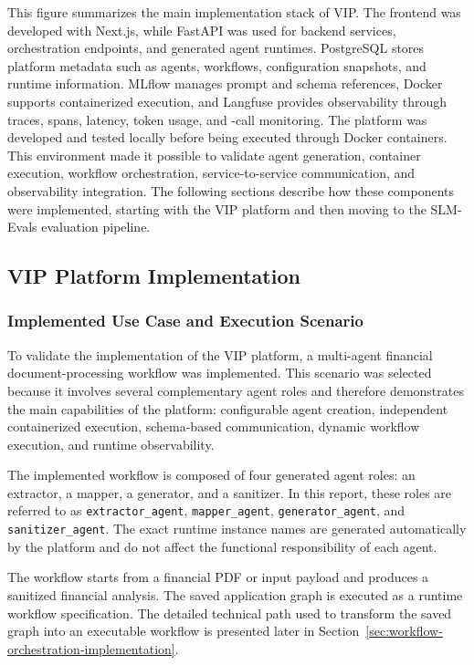 This figure summarizes the main implementation stack of VIP. The frontend was developed with Next.js, while FastAPI was used for backend services, orchestration endpoints, and generated agent runtimes. PostgreSQL stores platform metadata such as agents, workflows, configuration snapshots, and runtime information. MLflow manages prompt and schema references, Docker supports containerized execution, and Langfuse provides observability through traces, spans, latency, token usage, and 
-call monitoring.
\vspace{0.4cm}
The platform was developed and tested locally before being executed through Docker containers. This environment made it possible to validate agent generation, container execution, workflow orchestration, service-to-service communication, and observability integration. The following sections describe how these components were implemented, starting with the VIP platform and then moving to the SLM-Evals evaluation pipeline.



\subsection{VIP Platform Implementation}
    \subsubsection{Implemented Use Case and Execution Scenario}
 \label{sec:implemented-use-case}

To validate the implementation of the VIP platform, a multi-agent financial document-processing workflow was implemented. This scenario was selected because it involves several complementary agent roles and therefore demonstrates the main capabilities of the platform: configurable agent creation, independent containerized execution, schema-based communication, dynamic workflow execution, and runtime observability.

The implemented workflow is composed of four generated agent roles: an extractor, a mapper, a generator, and a sanitizer. In this report, these roles are referred to as \texttt{extractor\_agent}, \texttt{mapper\_agent}, \texttt{generator\_agent}, and \texttt{sanitizer\_agent}. The exact runtime instance names are generated automatically by the platform and do not affect the functional responsibility of each agent.

The workflow starts from a financial PDF or input payload and produces a sanitized financial analysis. The saved application graph is executed as a runtime workflow specification. The detailed technical path used to transform the saved graph into an executable workflow is presented later in Section~\ref{sec:workflow-orchestration-implementation}.

